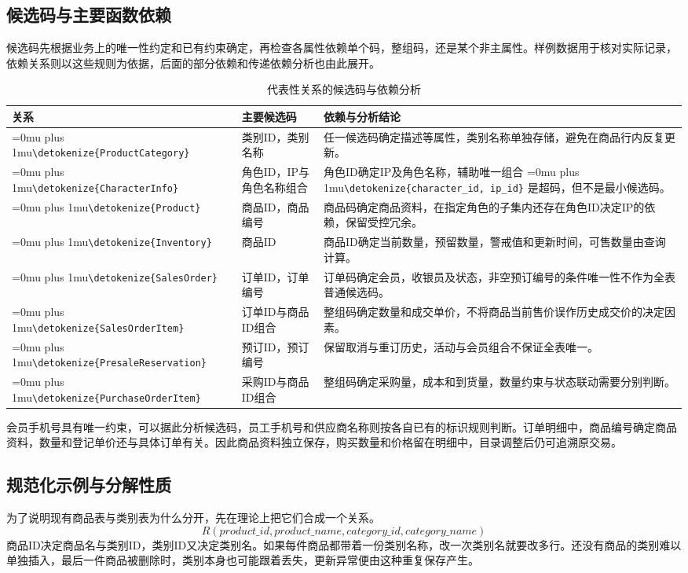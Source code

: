 \documentclass{SYSUReport}
\newcommand{\code}[1]{\begingroup\Urlmuskip=0mu plus 1mu\expandafter\nolinkurl\expandafter{\detokenize{#1}}\endgroup}
\begin{document}
\subsection{候选码与主要函数依赖}
候选码先根据业务上的唯一性约定和已有约束确定，再检查各属性依赖单个码，整组码，还是某个非主属性。样例数据用于核对实际记录，依赖关系则以这些规则为依据，后面的部分依赖和传递依赖分析也由此展开。

\begin{table}[H]\centering\small
\begin{tabularx}{\textwidth}{P{4.0cm}P{3.0cm}Y}
\toprule 关系 & 主要候选码 & 依赖与分析结论 \\
\midrule
\code{ProductCategory} & 类别ID，类别名称 & 任一候选码确定描述等属性，类别名称单独存储，避免在商品行内反复更新。 \\
\code{CharacterInfo} & 角色ID，IP与角色名称组合 & 角色ID确定IP及角色名称，辅助唯一组合 \code{character_id, ip_id} 是超码，但不是最小候选码。 \\
\code{Product} & 商品ID，商品编号 & 商品码确定商品资料，在指定角色的子集内还存在角色ID决定IP的依赖，保留受控冗余。 \\
\code{Inventory} & 商品ID & 商品ID确定当前数量，预留数量，警戒值和更新时间，可售数量由查询计算。 \\
\code{SalesOrder} & 订单ID，订单编号 & 订单码确定会员，收银员及状态，非空预订编号的条件唯一性不作为全表普通候选码。 \\
\code{SalesOrderItem} & 订单ID与商品ID组合 & 整组码确定数量和成交单价，不将商品当前售价误作历史成交价的决定因素。 \\
\code{PresaleReservation} & 预订ID，预订编号 & 保留取消与重订历史，活动与会员组合不保证全表唯一。 \\
\code{PurchaseOrderItem} & 采购ID与商品ID组合 & 整组码确定采购量，成本和到货量，数量约束与状态联动需要分别判断。 \\
\bottomrule
\end{tabularx}\caption{代表性关系的候选码与依赖分析}
\end{table}

会员手机号具有唯一约束，可以据此分析候选码，员工手机号和供应商名称则按各自已有的标识规则判断。订单明细中，商品编号确定商品资料，数量和登记单价还与具体订单有关。因此商品资料独立保存，购买数量和价格留在明细中，目录调整后仍可追溯原交易。

\medskip
\Needspace{0.50\textheight}
\subsection{规范化示例与分解性质}
为了说明现有商品表与类别表为什么分开，先在理论上把它们合成一个关系。
\[
R(\mathit{product\_id},\mathit{product\_name},\mathit{category\_id},\mathit{category\_name})
\]
商品ID决定商品名与类别ID，类别ID又决定类别名。如果每件商品都带着一份类别名称，改一次类别名就要改多行。还没有商品的类别难以单独插入，最后一件商品被删除时，类别本身也可能跟着丢失，更新异常便由这种重复保存产生。
\end{document}
